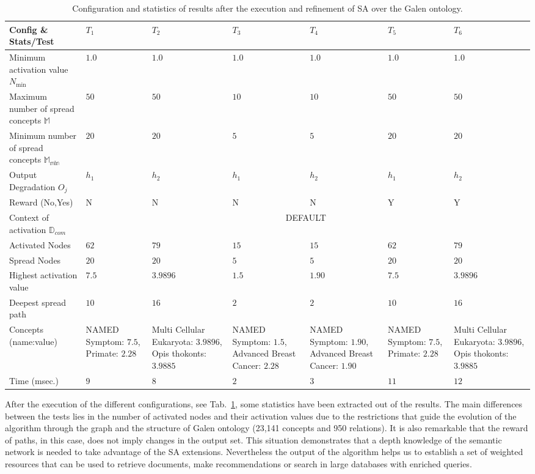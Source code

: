 \begin{table}[!h]
\renewcommand{\arraystretch}{1.3}
\begin{center}
\begin{tabular}{|p{3cm}|p{1.5cm}|p{1.5cm}|p{1.5cm}|p{1.5cm}|p{1.5cm}|p{1.5cm}|}
\hline
        \textbf{Config \& Stats/Test}&$T_1$&$T_2$&$T_3$&$T_4$&$T_5$&$T_6$\\ \hline
        \hline
        Minimum activation value $N_{\min}$ &$1.0$ &$1.0$ &$1.0$ &$1.0$&$1.0$&$1.0$ \\ \hline
	Maximum number of spread concepts $\mathbb{M}$&$50$ &$50$ &$10$ &$10$&$50$&$50$\\ \hline
	Minimum number of spread concepts $\mathbb{M_{\min}}$&$20$ &$20$ &$5$ &$5$&$20$&$20$  \\ \hline
	Output Degradation $O_j$ & $h_1$ &$h_2$ &$h_1$ &$h_2$&$h_1$&$h_2$\\ \hline
	Reward (No,Yes) &N &N &N &N&Y&Y\\ \hline
	\hline
	Context of activation $\mathbb{D}_{com}$&\multicolumn{6}{|c|}{DEFAULT} \\ \hline
	Activated Nodes &$62$ &$79$ &$15$ &$15$&$62$&$79$ \\ \hline
	Spread Nodes &$20$ &$20$ &$5$ &$5$&$20$&$20$ \\ \hline
	Highest activation value &$7.5$ &$3.9896$ &$1.5$ &$1.90$&$7.5$&$3.9896$\\ \hline
	Deepest spread path &$10$ &$16$&$2$ &$2$&$10$&$16$\\ \hline
	Concepts (name:value) & NAMED Symptom: $7.5$, Primate: $2.28$ &Multi Cellular Eukaryota: $3.9896$, Opis thokonts: $3.9885$ &NAMED Symptom: $1.5$, Advanced Breast Cancer: $2.28$ &NAMED Symptom: $1.90$, Advanced Breast Cancer: $1.90$&NAMED Symptom: $7.5$, Primate: $2.28$&Multi Cellular Eukaryota: $3.9896$, Opis thokonts: $3.9885$ \\ \hline
	Time (msec.) & $9$ &$8$ &$2$ &$3$&$11$&$12$ \\ \hline
\end{tabular}
  \caption{Configuration and statistics of results after the execution and refinement of SA over the Galen ontology.}
  \label{tabla:test-restricciones}
  \end{center}
\end{table} 

After the execution of the different configurations, see Tab.~\ref{tabla:test-restricciones}, some statistics have been extracted out of the results. 
The main differences between the tests lies in the number of activated nodes and their activation values due to the restrictions that guide the evolution
of the algorithm through the graph and the structure of Galen ontology (23,141 concepts and 950 relations). 
It is also remarkable that the reward of paths, in this case, does not imply changes in the output set. This situation demonstrates 
that a depth knowledge of the semantic network is needed to take advantage of the SA extensions. Nevertheless the output of the
algorithm helps us to establish a set of weighted resources that can be used to retrieve documents, make recommendations or search in 
large databases with enriched queries.